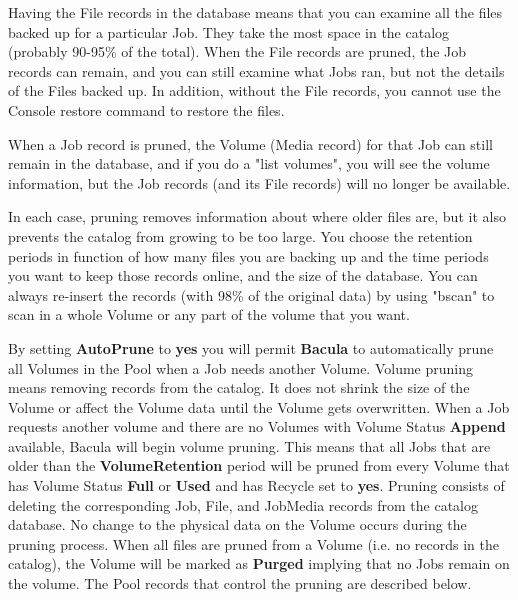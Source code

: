 Having the File records in the database means that you can examine all the
files backed up for a particular Job. They take the most space in the catalog
(probably 90-95\% of the total). When the File records are pruned, the Job
records can remain, and you can still examine what Jobs ran, but not the
details of the Files backed up. In addition, without the File records, you
cannot use the Console restore command to restore the files. 

When a Job record is pruned, the Volume (Media record) for that Job can still
remain in the database, and if you do a "list volumes", you will see the
volume information, but the Job records (and its File records) will no longer
be available. 

In each case, pruning removes information about where older files are, but it
also prevents the catalog from growing to be too large. You choose the
retention periods in function of how many files you are backing up and the
time periods you want to keep those records online, and the size of the
database. You can always re-insert the records (with 98\% of the original data)
by using "bscan" to scan in a whole Volume or any part of the volume that
you want. 

By setting {\bf AutoPrune} to {\bf yes} you will permit {\bf Bacula} to
automatically prune all Volumes in the Pool when a Job needs another Volume.
Volume pruning means removing records from the catalog. It does not shrink the
size of the Volume or affect the Volume data until the Volume gets
overwritten. When a Job requests another volume and there are no Volumes with
Volume Status {\bf Append} available, Bacula will begin volume pruning. This
means that all Jobs that are older than the {\bf VolumeRetention} period will
be pruned from every Volume that has Volume Status {\bf Full} or {\bf Used}
and has Recycle set to {\bf yes}. Pruning consists of deleting the
corresponding Job, File, and JobMedia records from the catalog database. No
change to the physical data on the Volume occurs during the pruning process.
When all files are pruned from a Volume (i.e. no records in the catalog), the
Volume will be marked as {\bf Purged} implying that no Jobs remain on the
volume. The Pool records that control the pruning are described below. 

